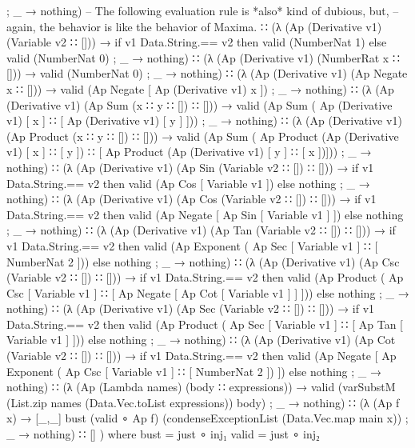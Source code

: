 \documentclass{report}
\begin{document}
\begin{code}
{           ; _ → nothing})
      -- The following evaluation rule is *also* kind of dubious, but,
      -- again, the behavior is like the behavior of Maxima.
      ∷ (λ { (Ap (Derivative v1) (Variable v2 ∷ [])) →
             if v1 Data.String.== v2
               then valid (NumberNat 1)
               else valid (NumberNat 0)
           ; _ → nothing})
      ∷ (λ { (Ap (Derivative v1) (NumberRat x ∷ [])) →
             valid (NumberNat 0)
           ; _ → nothing})
      ∷ (λ { (Ap (Derivative v1) (Ap Negate x ∷ [])) →
             valid (Ap Negate [ Ap (Derivative v1) x ])
           ; _ → nothing})
      ∷ (λ { (Ap (Derivative v1) (Ap Sum (x ∷ y ∷ []) ∷ [])) →
             valid (Ap Sum ( Ap (Derivative v1) [ x ]
                           ∷ [ Ap (Derivative v1) [ y ] ]))
           ; _ → nothing})
      ∷ (λ { (Ap (Derivative v1) (Ap Product (x ∷ y ∷ []) ∷ [])) →
             valid (Ap Sum
                       ( Ap Product (Ap (Derivative v1) [ x ] ∷ [ y ])
                       ∷ [ Ap Product (Ap (Derivative v1) [ y ] ∷ [ x ])]))
           ; _ → nothing})
      ∷ (λ { (Ap (Derivative v1) (Ap Sin (Variable v2 ∷ []) ∷ [])) →
             if v1 Data.String.== v2
               then valid (Ap Cos [ Variable v1 ])
               else nothing
           ; _ → nothing})
      ∷ (λ { (Ap (Derivative v1) (Ap Cos (Variable v2 ∷ []) ∷ [])) →
             if v1 Data.String.== v2
               then valid (Ap Negate [ Ap Sin [ Variable v1 ] ])
               else nothing
           ; _ → nothing})
      ∷ (λ { (Ap (Derivative v1) (Ap Tan (Variable v2 ∷ []) ∷ [])) →
             if v1 Data.String.== v2
               then valid (Ap Exponent ( Ap Sec [ Variable v1 ] ∷ [ NumberNat 2 ]))
               else nothing
           ; _ → nothing})
      ∷ (λ { (Ap (Derivative v1) (Ap Csc (Variable v2 ∷ []) ∷ [])) →
             if v1 Data.String.== v2
               then valid (Ap Product
                              ( Ap Csc [ Variable v1 ]
                              ∷ [ Ap Negate [ Ap Cot [ Variable v1 ] ] ]))
               else nothing
           ; _ → nothing})
      ∷ (λ { (Ap (Derivative v1) (Ap Sec (Variable v2 ∷ []) ∷ [])) →
             if v1 Data.String.== v2
               then valid (Ap Product
                              ( Ap Sec [ Variable v1 ]
                              ∷ [ Ap Tan [ Variable v1 ] ]))
               else nothing
           ; _ → nothing})
      ∷ (λ { (Ap (Derivative v1) (Ap Cot (Variable v2 ∷ []) ∷ [])) →
             if v1 Data.String.== v2
               then valid (Ap Negate
                              [ Ap Exponent
                                   ( Ap Csc [ Variable v1 ]
                                   ∷ [ NumberNat 2 ]) ])
               else nothing
           ; _ → nothing})
      ∷ (λ { (Ap (Lambda names) (body ∷ expressions)) →
             valid (varSubstM (List.zip names (Data.Vec.toList expressions)) body)
           ; _ → nothing})
      ∷ (λ { (Ap f x) → [_,_] bust
                              (valid ∘ Ap f)
                              (condenseExceptionList (Data.Vec.map main x))
           ; _ → nothing})
      ∷ []
      )
      where
      bust = just ∘ inj₁
      valid = just ∘ inj₂


\end{code}
\end{document}
